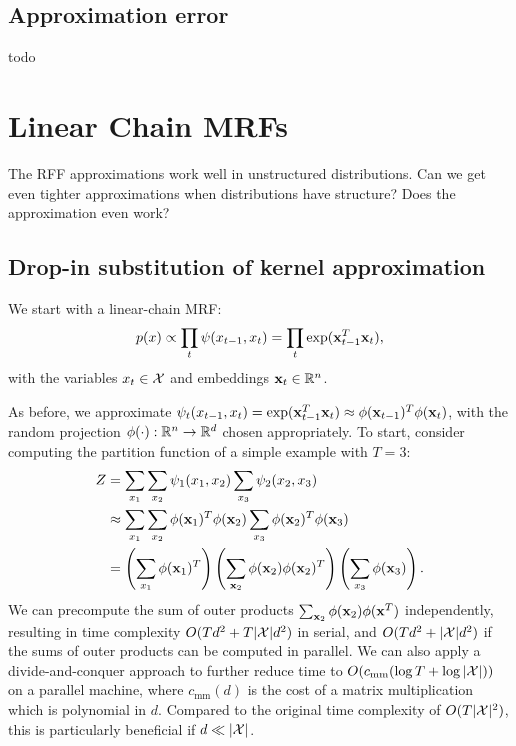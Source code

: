 \documentclass{article}
\begin{document}
\subsection{Approximation error}
todo

\section{Linear Chain MRFs}
The RFF approximations work well in unstructured distributions.
Can we get even tighter approximations when distributions have structure?
Does the approximation even work?

\subsection{Drop-in substitution of kernel approximation}
We start with a linear-chain MRF:
$$p(x) \propto \prod_t \psi(x_{t-1},x_t) = \prod_t \exp(\mathbf{x}_{t-1}^T\mathbf{x}_t),$$
with the variables $x_t\in\mathcal{X}$ and embeddings $\mathbf{x}_t\in\mathbb{R}^n$.
\begin{comment}
\begin{figure}[h]
\centering
\begin{tikzpicture}
\node[latent] (x1) {$x_1$};
\node[latent, right=of x1] (x2) {$x_2$};
\node[latent, right=of x2] (x3) {$x_3$};
\factor[right=of x1] {f1} {$\psi(x_1,x_2)$} {} {};
\factor[right=of x2] {f2} {$\psi(x_2,x_3)$} {} {};
\factoredge {x1,x2} {f1} {};
\factoredge {x2,x3} {f2} {};
\end{tikzpicture}
\caption{
\label{fig:linear-chain}
}
\end{figure}
\end{comment}
As before, we approximate
$\psi_t(x_{t-1}, x_t) = \exp(\mathbf{x}_{t-1}^T \mathbf{x}_t) \approx \phi(\mathbf{x}_{t-1})^T\phi(\mathbf{x}_t)$,
with the random projection $\phi(\cdot): \mathbb{R}^n \to \mathbb{R}^d$ chosen appropriately.
To start, consider computing the partition function of a simple example with $T=3$:
\begin{equation}
\begin{aligned}
Z
&= \sum_{x_1}\sum_{x_2} \psi_1(x_1, x_2) \sum_{x_3} \psi_2(x_2, x_3) \\
&\approx \sum_{x_1}\sum_{x_2} \phi(\mathbf{x}_1)^T\phi(\mathbf{x}_2) \sum_{x_3} \phi(\mathbf{x}_2)^T\phi(\mathbf{x}_3)\\
&= \left(\sum_{x_1} \phi(\mathbf{x}_1)^T\right) \left(\sum_{\mathbf{x}_2} \phi(\mathbf{x}_2)\phi(\mathbf{x}_2)^T\right)
    \left(\sum_{x_3}\phi(\mathbf{x}_3)\right).
\end{aligned}
\end{equation}
We can precompute the sum of outer products $\sum_{\mathbf{x}_2}\phi(\mathbf{x}_2)\phi(\mathbf{x}^T)$ independently,
resulting in time complexity $O(Td^2 + T|\mathcal{X}|d^2)$ in serial,
and $O(Td^2 + |\mathcal{X}|d^2)$ if the sums of outer products can be computed in parallel.
We can also apply a divide-and-conquer approach to further
reduce time to $O(c_{\textrm{mm}}(\log T + \log |\mathcal{X}|))$ on a parallel machine,
where $c_{\textrm{mm}}(d)$ is the cost of a matrix multiplication which is polynomial in $d$.
Compared to the original time complexity of $O(T|\mathcal{X}|^2)$,
this is particularly beneficial if $d \ll |\mathcal{X}|$.
\end{document}
